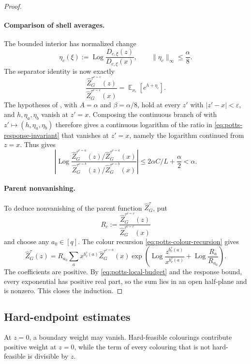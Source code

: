 \documentclass[11pt,reqno]{article}
\theoremstyle{plain}
\theoremstyle{definition}
\theoremstyle{remark}
\theoremstyle{definition}
\theoremstyle{remark}
\newcommand{\eps}{\varepsilon}
\newcommand{\Log}{\operatorname{Log}}          %
\DeclareMathOperator{\E}{\mathbb{E}}
\newcommand{\colours}{[q]}                        %
\newcommand{\bcount}{b}
\newcommand{\nZpin}[2]{\widehat Z_{#1}^{#2}}
\begin{document}
\begin{proof}
\paragraph{Comparison of shell averages.}
The bounded interior has normalized change
\[
  \eta_c(\xi):=\Log\frac{D_{c,\xi}(z)}{D_{c,\xi}(x)},
  \qquad
  \|\eta_c\|_\infty\le\frac\alpha8.
\]
The separator identity is now exactly
\begin{equation}\label{eq:potts-separator-expectation}
  \frac{\nZpin{G}{\tau^{v=c}}(z)}
       {\nZpin{G}{\tau^{v=c}}(x)}
  =\E_{\nu_c}[e^{h+\eta_c}].
\end{equation}
The hypotheses of , with \(A=\alpha\) and
\(\beta=\alpha/8\), hold at every \(z'\) with \(|z'-x|<\eps\), and
\(h,\eta_a,\eta_b\) vanish at \(z'=x\).  Composing the continuous branch
of  with \(z'\mapsto(h,\eta_a,\eta_b)\) therefore gives a
continuous logarithm of the ratio in \eqref{eq:potts-response-invariant}
that vanishes at \(z'=x\), namely the logarithm continued from \(z=x\).
Thus  gives
\[
  \left|\Log
  \frac{\nZpin{G}{\tau^{v=a}}(z)/\nZpin{G}{\tau^{v=a}}(x)}
       {\nZpin{G}{\tau^{v=b}}(z)/\nZpin{G}{\tau^{v=b}}(x)}\right|
  \le2\alpha C/L+\frac\alpha2<\alpha.
\]

\paragraph{Parent nonvanishing.}
To deduce nonvanishing of the parent function \(\nZpin{G}{\tau}\), put
\[
  R_c:=\frac{\nZpin{G}{\tau^{v=c}}(z)}
             {\nZpin{G}{\tau^{v=c}}(x)}
\]
and choose any \(a_0\in\colours\).  The colour recursion
\eqref{eq:potts-colour-recursion} gives
\[
  \nZpin{G}{\tau}(z)
  =R_{a_0}
   \sum_a x^{\bcount_v^\tau(a)}\nZpin{G}{\tau^{v=a}}(x)
   \exp\!\left(
      \Log\frac{z^{\bcount_v^\tau(a)}}{x^{\bcount_v^\tau(a)}}
      +\Log\frac{R_a}{R_{a_0}}\right).
\]
The coefficients are positive.  By \eqref{eq:potts-local-budget} and the
response bound, every exponential has positive real part,
so the sum lies in an open half-plane and is nonzero.  This closes the
induction.
\end{proof}

\subsection{Hard-endpoint estimates}
\label{sec:hard-endpoint}

At \(z=0\), a boundary weight may vanish.  Hard-feasible colourings contribute
positive weight at \(z=0\), while the term of every colouring that is not
hard-feasible is divisible by \(z\).
\end{document}
